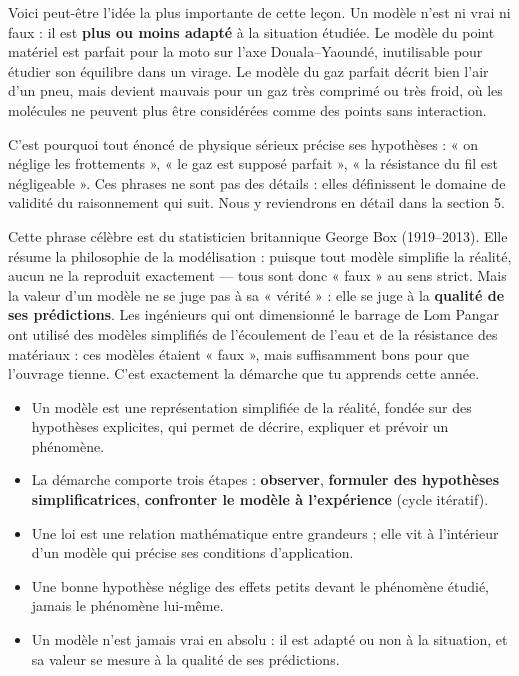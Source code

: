 \documentclass[11pt]{article}
\newcommand{\cle}[1]{{\popxbold\color{popdark}#1}}
\newcounter{popsec}
\newcounter{popsub}
\newcommand{\courssub}[1]{%
  \stepcounter{popsub}%
  \par\vspace{9pt}\noindent{\popxbold\fontsize{11.5}{13}\selectfont\color{popink}{\color{poporange}\thepopsec.\thepopsub}\hspace{6pt}#1}\par\nopagebreak\vspace{4pt}
}
\begin{document}
\courssub{Un modèle n'est jamais « vrai » en absolu}

Voici peut-être l'idée la plus importante de cette leçon. Un modèle n'est ni vrai ni faux : il est \textbf{plus ou moins adapté} à la situation étudiée. Le modèle du point matériel est parfait pour la moto sur l'axe Douala--Yaoundé, inutilisable pour étudier son équilibre dans un virage. Le modèle du gaz parfait décrit bien l'air d'un pneu, mais devient mauvais pour un gaz très comprimé ou très froid, où les molécules ne peuvent plus être considérées comme des points sans interaction.

C'est pourquoi tout énoncé de physique sérieux précise ses hypothèses : « on néglige les frottements », « le gaz est supposé parfait », « la résistance du fil est négligeable ». Ces phrases ne sont pas des détails : elles définissent le \cle{domaine de validité} du raisonnement qui suit. Nous y reviendrons en détail dans la section 5.

\begin{savaistu}
Cette phrase célèbre est du statisticien britannique George Box (1919--2013). Elle résume la philosophie de la modélisation : puisque tout modèle simplifie la réalité, aucun ne la reproduit exactement — tous sont donc « faux » au sens strict. Mais la valeur d'un modèle ne se juge pas à sa « vérité » : elle se juge à la \textbf{qualité de ses prédictions}. Les ingénieurs qui ont dimensionné le barrage de Lom Pangar ont utilisé des modèles simplifiés de l'écoulement de l'eau et de la résistance des matériaux : ces modèles étaient « faux », mais suffisamment bons pour que l'ouvrage tienne. C'est exactement la démarche que tu apprends cette année.
\end{savaistu}

\begin{aretenir}
\begin{itemize}
\item Un \cle{modèle} est une représentation simplifiée de la réalité, fondée sur des hypothèses explicites, qui permet de décrire, expliquer et prévoir un phénomène.
\item La démarche comporte trois étapes : \textbf{observer}, \textbf{formuler des hypothèses simplificatrices}, \textbf{confronter le modèle à l'expérience} (cycle itératif).
\item Une \cle{loi} est une relation mathématique entre grandeurs ; elle vit à l'intérieur d'un modèle qui précise ses conditions d'application.
\item Une bonne hypothèse néglige des effets petits devant le phénomène étudié, jamais le phénomène lui-même.
\item Un modèle n'est jamais vrai en absolu : il est adapté ou non à la situation, et sa valeur se mesure à la qualité de ses prédictions.
\end{itemize}
\end{aretenir}
\end{document}
